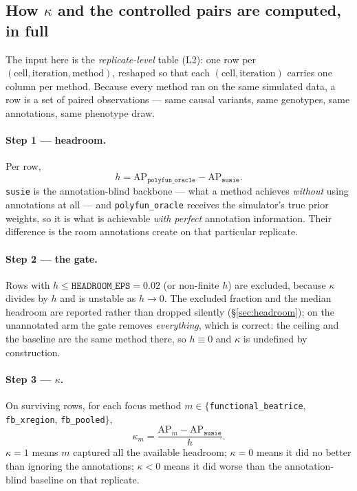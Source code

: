 \subsection{How $\kappa$ and the controlled pairs are computed, in full}\label{sec:ghow}

The input here is the \emph{replicate-level} table (L2): one row per
$(\text{cell},\text{iteration},\text{method})$, reshaped so that each
$(\text{cell},\text{iteration})$ carries one column per method. Because every
method ran on the same simulated data, a row is a set of paired observations ---
same causal variants, same genotypes, same annotations, same phenotype draw.

\paragraph{Step 1 --- headroom.}
Per row,
\[
h=\mathrm{AP}_{\texttt{polyfun\_oracle}}-\mathrm{AP}_{\texttt{susie}} .
\]
\texttt{susie} is the annotation-blind backbone --- what a method achieves
\emph{without} using annotations at all --- and \texttt{polyfun\_oracle} receives
the simulator's true prior weights, so it is what is achievable \emph{with
perfect} annotation information. Their difference is the room annotations
create on that particular replicate.

\paragraph{Step 2 --- the gate.}
Rows with $h\le\texttt{HEADROOM\_EPS}=0.02$ (or non-finite $h$) are excluded,
because $\kappa$ divides by $h$ and is unstable as $h\to0$. The excluded
fraction and the median headroom are reported rather than dropped silently
(\S\ref{sec:headroom}); on the unannotated arm the gate removes
\emph{everything}, which is correct: the ceiling and the baseline are the same
method there, so $h\equiv0$ and $\kappa$ is undefined by construction.

\paragraph{Step 3 --- $\kappa$.}
On surviving rows, for each focus method $m\in\{$\texttt{functional\_beatrice},
\texttt{fb\_xregion}, \texttt{fb\_pooled}$\}$,
\[
\kappa_m=\frac{\mathrm{AP}_m-\mathrm{AP}_{\texttt{susie}}}{h} .
\]
$\kappa=1$ means $m$ captured all the available headroom; $\kappa=0$ means it
did no better than ignoring the annotations; $\kappa<0$ means it did worse than
the annotation-blind baseline on that replicate.

